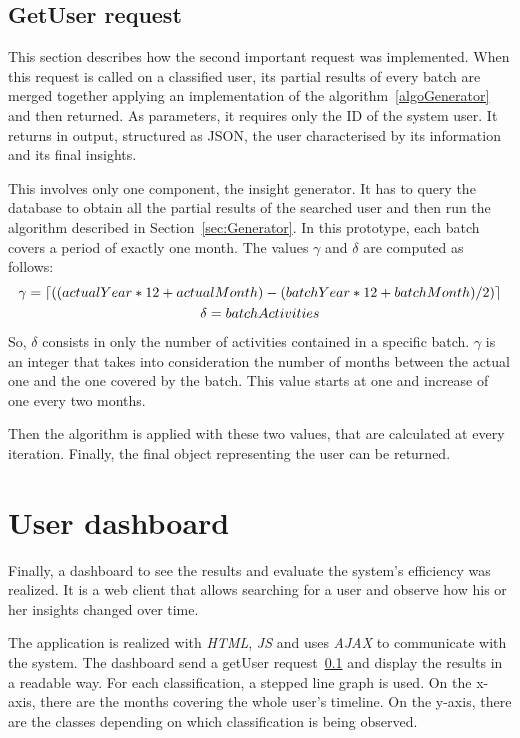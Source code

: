 \subsection{GetUser request}
\label{sec:getUserReq}
This section describes how the second important request was implemented.
When this request is called on a classified user, its partial results of every batch are merged together applying an implementation of the algorithm~\ref{algoGenerator} and then returned.
As parameters, it requires only the ID of the system user. It returns in output, structured as JSON, the user characterised by its information and its final insights.

This involves only one component, the insight generator. It has to query the database to obtain all the partial results of the searched user and then run the algorithm described in Section~\ref{sec:Generator}.
In this prototype, each batch covers a period of exactly one month. 
The values $\gamma$ and $\delta$ are computed as follows:
\begin{gather}
\label{gamma}
\gamma = \left\lceil ((actualYear*12 + actualMonth) - (batchYear*12 + batchMonth)/2) \right\rceil \\
\delta = batchActivities
\end{gather}
So, $\delta$ consists in only the number of activities contained in a specific batch. 
$\gamma$ is an integer that takes into consideration the number of months between the actual one and the one covered by the batch. This value starts at one and increase of one every two months.

Then the algorithm is applied with these two values, that are calculated at every iteration.
Finally, the final object representing the user can be returned.


\section{User dashboard}
\label{sec:userDash}
Finally, a dashboard to see the results and evaluate the system's efficiency was realized.
It is a web client that allows searching for a user and observe how his or her insights changed over time.

The application is realized with \textit{HTML}, \textit{JS} and uses \textit{AJAX} to communicate with the system.
The dashboard send a getUser request~\ref{sec:getUserReq} and display the results in a readable way.
For each classification, a stepped line graph is used. On the x-axis, there are the months covering the whole user's timeline.
On the y-axis, there are the classes depending on which classification is being observed.

